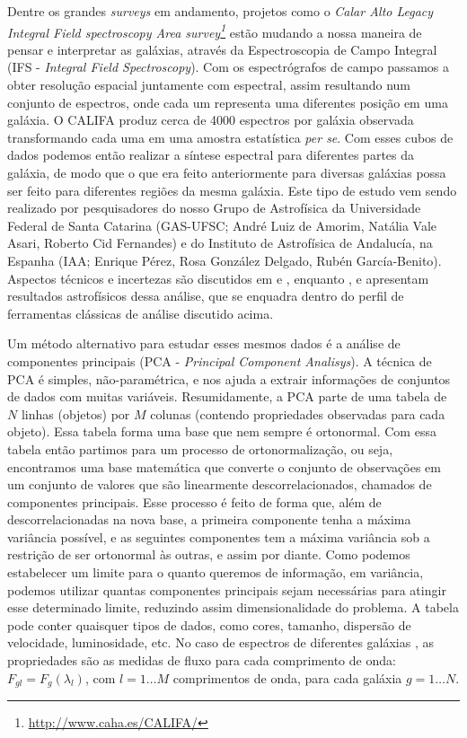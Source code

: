 \documentclass[a4paper,12pt]{article}
\begin{document}
Dentre os grandes {\em surveys} em andamento, projetos como o {\em Calar Alto Legacy Integral Field spectroscopy Area
survey\footnote{\url{http://www.caha.es/CALIFA/}}} \citep[CALIFA; ][]{CALIFAPresent2012} estão mudando  a nossa maneira de pensar e interpretar as
galáxias, através da Espectroscopia de Campo Integral (IFS - {\em Integral Field Spectroscopy}). Com os espectrógrafos de campo passamos a obter
resolução espacial juntamente com espectral, assim resultando num conjunto de espectros, onde cada um representa uma diferentes posição em uma
galáxia. O CALIFA produz cerca de 4000 espectros por galáxia observada transformando cada uma em uma amostra estatística {\em per se}. Com esses cubos
de dados podemos então realizar a síntese espectral para diferentes partes da galáxia, de modo que o que era feito anteriormente para diversas
galáxias possa ser feito para diferentes regiões da mesma galáxia. Este tipo de estudo vem sendo realizado por pesquisadores do nosso Grupo de
Astrofísica da Universidade Federal de Santa Catarina (GAS-UFSC; André Luiz de Amorim, Natália Vale Asari, Roberto Cid Fernandes) e do Instituto de
Astrofísica de Andalucía, na Espanha (IAA; Enrique Pérez, Rosa González Delgado, Rubén García-Benito). Aspectos técnicos e incertezas são discutidos
em \citet{CidFernandes2013} e \citet{CidFernandes2014}, enquanto \citet{Perez2013}, e \citet{GonzalezDelgado2014} apresentam resultados astrofísicos
dessa análise, que se enquadra dentro do perfil de ferramentas clássicas de análise discutido acima.

Um método alternativo para estudar esses mesmos dados é a análise de componentes principais (PCA - {\em Principal Component Analisys}). A técnica de
PCA é simples, não-paramétrica, e nos ajuda a extrair informações de conjuntos de dados com muitas variáveis. Resumidamente, a PCA parte de uma tabela
de $N$ linhas (objetos) por $M$ colunas (contendo propriedades observadas para cada objeto). Essa tabela forma uma base que nem sempre é ortonormal.
Com essa tabela então partimos para um processo de ortonormalização, ou seja, encontramos uma base matemática que converte o conjunto de observações
em um conjunto de valores que são linearmente descorrelacionados, chamados de componentes principais. Esse processo é feito de forma que, além de
descorrelacionadas na nova base, a primeira componente tenha a máxima variância possível, e as seguintes componentes tem a máxima variância sob a
restrição de ser ortonormal às outras, e assim por diante. Como podemos estabelecer um limite para o quanto queremos de informação, em variância,
podemos utilizar quantas componentes principais sejam necessárias para atingir esse determinado limite, reduzindo assim dimensionalidade do problema.
A tabela pode conter quaisquer tipos de dados, como cores, tamanho, dispersão de velocidade, luminosidade, etc. No caso de espectros de diferentes
galáxias \citep[e.g., ][]{Francis1992, Sodre1994, Sodre1997}, as propriedades são as medidas de fluxo para cada comprimento de onda: $F_{gl} =
F_g(\lambda_l)$, com $l = 1 \ldots M$ comprimentos de onda, para cada galáxia $g = 1 \ldots N$.
\end{document}
